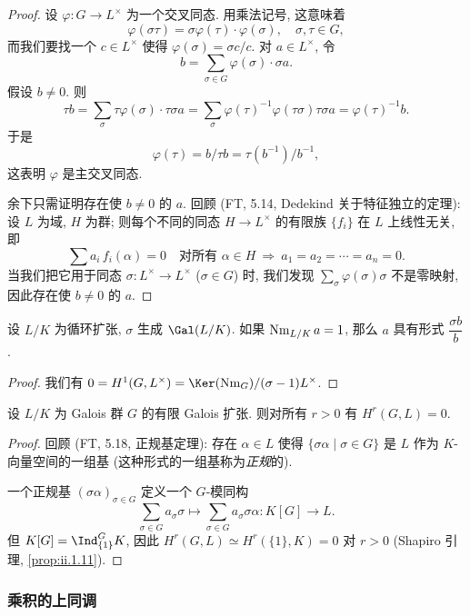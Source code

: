 \begin{proof}
设 $\varphi\colon G\to L^\times$ 为一个交叉同态. 用乘法记号, 这意味着
\[
 \varphi(\sigma\tau)=\sigma\varphi(\tau)\cdot\varphi(\sigma),\quad \sigma,\tau\in G,
\]
而我们要找一个 $c\in L^\times$ 使得 $\varphi(\sigma)=\sigma c/c$. 对 $a\in L^\times$, 令
\[
 b=\sum_{\sigma\in G}\varphi(\sigma)\cdot\sigma a.
\]
假设 $b\neq 0$. 则
\[
 \tau b=\sum_\sigma\tau\varphi(\sigma)\cdot\tau\sigma a=\sum_\sigma\varphi(\tau)^{-1}\varphi(\tau\sigma)\tau\sigma a=\varphi(\tau)^{-1}b.
\]
于是
\[
 \varphi(\tau)=b/\tau b=\tau(b^{-1})/b^{-1},
\]
这表明 $\varphi$ 是主交叉同态.

余下只需证明存在使 $b\neq 0$ 的 $a$. 回顾 (FT, 5.14, Dedekind 关于特征独立的定理): 设 $L$ 为域, $H$ 为群; 则每个不同的同态 $H\to L^\times$ 的有限族 $\{f_i\}$ 在 $L$ 上线性无关, 即
\[
 \sum a_i\, f_i(\alpha)=0\quad\text{对所有 }\alpha\in H\ \Longrightarrow\ a_1=a_2=\cdots=a_n=0.
\]
当我们把它用于同态 $\sigma\colon L^\times\to L^\times$ ($\sigma\in G$) 时, 我们发现 $\sum_\sigma\varphi(\sigma)\sigma$ 不是零映射, 因此存在使 $b\neq 0$ 的 $a$.
\end{proof}

\begin{corollary}\label{cor:ii.1.23}
设 $L/K$ 为循环扩张, $\sigma$ 生成 $\Gal(L/K)$. 如果 $\operatorname{Nm}_{L/K}a=1$, 那么 $a$ 具有形式 $\dfrac{\sigma b}{b}$.
\end{corollary}

\begin{proof}
我们有 $0=H^1(G,L^\times)=\Ker(\Nm_G)/(\sigma-1)L^\times$.
\end{proof}

\begin{proposition}\label{prop:ii.1.24}
设 $L/K$ 为 Galois 群 $G$ 的有限 Galois 扩张. 则对所有 $r>0$ 有 $H^r(G,L)=0$.
\end{proposition}

\begin{proof}
回顾 (FT, 5.18, 正规基定理): 存在 $\alpha\in L$ 使得 $\{\sigma\alpha\mid \sigma\in G\}$ 是 $L$ 作为 $K$-向量空间的一组基 (这种形式的一组基称为\emph{正规}的).

一个正规基 $(\sigma\alpha)_{\sigma\in G}$ 定义一个 $G$-模同构
\[
 \sum_{\sigma\in G} a_\sigma\sigma\mapsto \sum_{\sigma\in G} a_\sigma\sigma\alpha\colon K[G]\to L.
\]
但 $K[G]=\Ind_{\{1\}}^G K$, 因此 $H^r(G,L)\simeq H^r(\{1\},K)=0$ 对 $r>0$ (Shapiro 引理, \ref{prop:ii.1.11}).
\end{proof}

\subsubsection*{乘积的上同调}

